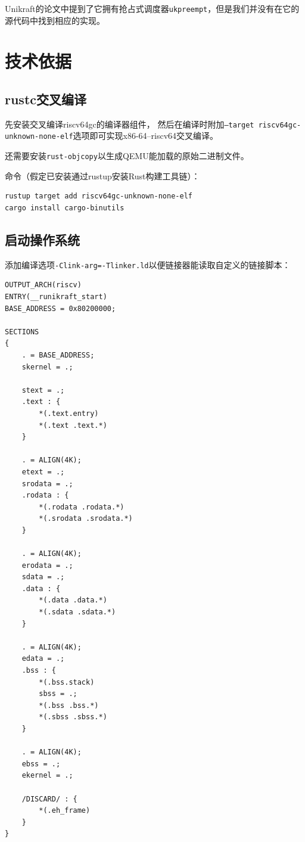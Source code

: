\documentclass[UTF8,fontset=none,linespread=1.15]{ctexart}
\begin{document}
Unikraft的论文中提到了它拥有抢占式调度器\texttt{ukpreempt}，但是我们并没有在它的源代码中找到相应的实现。

\section{技术依据}
\subsection{rustc交叉编译}
先安装交叉编译riscv64gc的编译器组件，
然后在编译时附加\texttt{--target riscv64gc-\linebreak unknown-none-elf}选项即可实现x86-64--riscv64交叉编译。

还需要安装\texttt{rust-objcopy}以生成QEMU能加载的原始二进制文件。

\noindent 命令（假定已安装通过rustup安装Rust构建工具链）：
\begin{lstlisting}
rustup target add riscv64gc-unknown-none-elf
cargo install cargo-binutils
\end{lstlisting}

\subsection{启动操作系统}
添加编译选项\texttt{-Clink-arg=-Tlinker.ld}以便链接器能读取自定义的链接脚本：
\begin{multicols}{2}
\begin{lstlisting}
OUTPUT_ARCH(riscv)
ENTRY(__runikraft_start)
BASE_ADDRESS = 0x80200000;

SECTIONS
{
    . = BASE_ADDRESS;
    skernel = .;

    stext = .;
    .text : {
        *(.text.entry)
        *(.text .text.*)
    }

    . = ALIGN(4K);
    etext = .;
    srodata = .;
    .rodata : {
        *(.rodata .rodata.*)
        *(.srodata .srodata.*)
    }

    . = ALIGN(4K);
    erodata = .;
    sdata = .;
    .data : {
        *(.data .data.*)
        *(.sdata .sdata.*)
    }

    . = ALIGN(4K);
    edata = .;
    .bss : {
        *(.bss.stack)
        sbss = .;
        *(.bss .bss.*)
        *(.sbss .sbss.*)
    }

    . = ALIGN(4K);
    ebss = .;
    ekernel = .;

    /DISCARD/ : {
        *(.eh_frame)
    }
}
\end{lstlisting}
\end{multicols}
\end{document}
